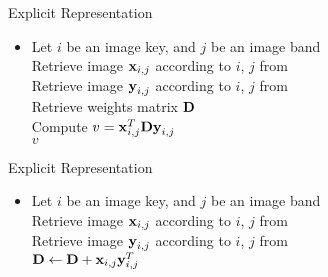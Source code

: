 \begin{frame}{Explicit Representation}
    \begin{itemize}
        \item[\xspace]
            \begin{algorithm}[H]
                \SetAlgoLined
                     {
                        Let $i$ be an image key, and $j$ be an image band \\
                        Retrieve image $\boldsymbol{\mathbf{x}}_{i,j}$ according to $i$, $j$ from \usno \\
                        Retrieve image $\boldsymbol{\mathbf{y}}_{i,j}$ according to $i$, $j$ from \panstarrs \\
                        Retrieve weights matrix $\vect{D}$ \\
                        Compute $v = \boldsymbol{\mathbf{x}}_{i,j}^T \boldsymbol{\mathbf{D}} \boldsymbol{\mathbf{y}}_{i,j}$ \\
                        \Return $v$
                    }
                \caption{Pseudo--code for computing the value $v$ \newline
                for a mission setup using the explicit definition of the \newline
                matrix $\vect{D}$.}
                \label{pscode:compute-v:explicit}
            \end{algorithm}
    \end{itemize}
\end{frame}

\begin{frame}{Explicit Representation}
    \begin{itemize}
        \item[\xspace]
            \begin{algorithm}[H]
                \SetAlgoLined
                     {
                        Let $i$ be an image key, and $j$ be an image band \\
                        Retrieve image $\boldsymbol{\mathbf{x}}_{i,j}$ according to $i$, $j$ from \usno \\
                        Retrieve image $\boldsymbol{\mathbf{y}}_{i,j}$ according to $i$, $j$ from \panstarrs \\
                        $\boldsymbol{\mathbf{D}} \gets \boldsymbol{\mathbf{D}} + \boldsymbol{\mathbf{x}}_{i,j}\boldsymbol{\mathbf{y}}_{i,j}^T$ \\
                    }
                \caption{Pseudo--code for updating the explicit \newline
                representation of the matrix $\vect{D}$.}
                \label{pscode:update-d:explicit}
            \end{algorithm}
    \end{itemize}
\end{frame}
